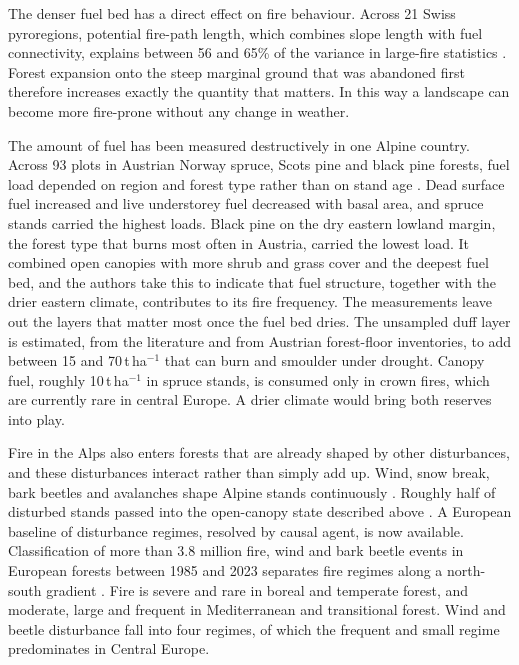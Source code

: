 \documentclass[11pt,a4paper]{article}
\begin{document}
The denser fuel bed has a direct effect on fire behaviour. Across 21 Swiss pyroregions, potential fire-path length, which combines slope length with fuel connectivity, explains between 56 and 65\% of the variance in large-fire statistics \citep{conedera_linking_2024}. Forest expansion onto the steep marginal ground that was abandoned first therefore increases exactly the quantity that matters. In this way a landscape can become more fire-prone without any change in weather.

The amount of fuel has been measured destructively in one Alpine country. Across 93 plots in Austrian Norway spruce, Scots pine and black pine forests, fuel load depended on region and forest type rather than on stand age \citep{neumann_fuel_2022}. Dead surface fuel increased and live understorey fuel decreased with basal area, and spruce stands carried the highest loads. Black pine on the dry eastern lowland margin, the forest type that burns most often in Austria, carried the lowest load. It combined open canopies with more shrub and grass cover and the deepest fuel bed, and the authors take this to indicate that fuel structure, together with the drier eastern climate, contributes to its fire frequency. The measurements leave out the layers that matter most once the fuel bed dries. The unsampled duff layer is estimated, from the literature and from Austrian forest-floor inventories, to add between 15 and 70\,t\,ha$^{-1}$ that can burn and smoulder under drought. Canopy fuel, roughly 10\,t\,ha$^{-1}$ in spruce stands, is consumed only in crown fires, which are currently rare in central Europe. A drier climate would bring both reserves into play.

Fire in the Alps also enters forests that are already shaped by other disturbances, and these disturbances interact rather than simply add up. Wind, snow break, bark beetles and avalanches shape Alpine stands continuously \citep{bebi_changes_2017}. Roughly half of disturbed stands passed into the open-canopy state described above \citep{stritih_alternative_2023}. A European baseline of disturbance regimes, resolved by causal agent, is now available. Classification of more than 3.8 million fire, wind and bark beetle events in European forests between 1985 and 2023 separates fire regimes along a north-south gradient \citep{miguel_unravelling_2026}. Fire is severe and rare in boreal and temperate forest, and moderate, large and frequent in Mediterranean and transitional forest. Wind and beetle disturbance fall into four regimes, of which the frequent and small regime predominates in Central Europe.
\end{document}
